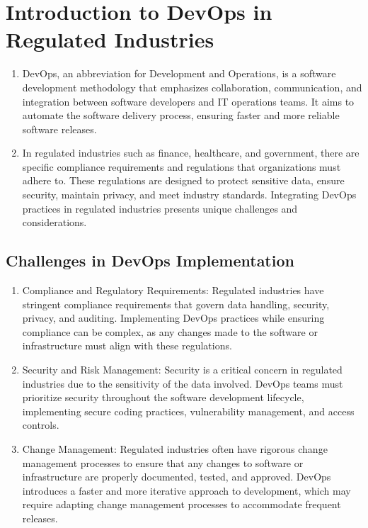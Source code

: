 \chapter*{Introduction to DevOps in Regulated Industries}

\begin{enumerate}
    \item DevOps, an abbreviation for Development and Operations, is a software development methodology that emphasizes collaboration, communication, and integration between software developers and IT operations teams. It aims to automate the software delivery process, ensuring faster and more reliable software releases.

    \item In regulated industries such as finance, healthcare, and government, there are specific compliance requirements and regulations that organizations must adhere to. These regulations are designed to protect sensitive data, ensure security, maintain privacy, and meet industry standards. Integrating DevOps practices in regulated industries presents unique challenges and considerations.
\end{enumerate}

\section*{Challenges in DevOps Implementation}

\begin{enumerate}
    \item Compliance and Regulatory Requirements: Regulated industries have stringent compliance requirements that govern data handling, security, privacy, and auditing. Implementing DevOps practices while ensuring compliance can be complex, as any changes made to the software or infrastructure must align with these regulations.

    \item Security and Risk Management: Security is a critical concern in regulated industries due to the sensitivity of the data involved. DevOps teams must prioritize security throughout the software development lifecycle, implementing secure coding practices, vulnerability management, and access controls.

    \item Change Management: Regulated industries often have rigorous change management processes to ensure that any changes to software or infrastructure are properly documented, tested, and approved. DevOps introduces a faster and more iterative approach to development, which may require adapting change management processes to accommodate frequent releases.
\end{enumerate}

